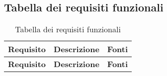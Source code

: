 \subsection{Tabella dei requisiti funzionali}

	\begin{longtable}{|l|p{}|c|}
		\caption{Tabella dei requisiti funzionali}
		
		\toprule
		\textbf{Requisito} & \textbf{Descrizione} & \textbf{Fonti} \\
		\midrule
		\endfirsthead
		
		\toprule
		\endhead
		
		\midrule
		\endfoot
		
		\bottomrule
		\endlastfoot

		
		\textbf{Requisito} & \textbf{Descrizione} & \textbf{Fonti} \\ \midrule 	\midrule
		
		
		

\end{longtable}

